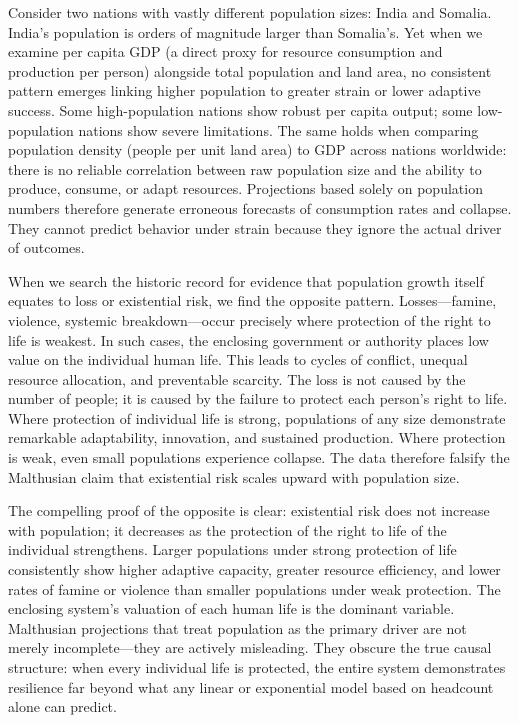 Consider two nations with vastly different population sizes: India and Somalia. India’s population is orders of magnitude larger than Somalia’s. Yet when we examine per capita GDP (a direct proxy for resource consumption and production per person) alongside total population and land area, no consistent pattern emerges linking higher population to greater strain or lower adaptive success. Some high-population nations show robust per capita output; some low-population nations show severe limitations. The same holds when comparing population density (people per unit land area) to GDP across nations worldwide: there is no reliable correlation between raw population size and the ability to produce, consume, or adapt resources. Projections based solely on population numbers therefore generate erroneous forecasts of consumption rates and collapse. They cannot predict behavior under strain because they ignore the actual driver of outcomes.

When we search the historic record for evidence that population growth itself equates to loss or existential risk, we find the opposite pattern. Losses—famine, violence, systemic breakdown—occur precisely where protection of the right to life is weakest. In such cases, the enclosing government or authority places low value on the individual human life. This leads to cycles of conflict, unequal resource allocation, and preventable scarcity. The loss is not caused by the number of people; it is caused by the failure to protect each person’s right to life. Where protection of individual life is strong, populations of any size demonstrate remarkable adaptability, innovation, and sustained production. Where protection is weak, even small populations experience collapse. The data therefore falsify the Malthusian claim that existential risk scales upward with population size.

The compelling proof of the opposite is clear: existential risk does not increase with population; it decreases as the protection of the right to life of the individual strengthens. Larger populations under strong protection of life consistently show higher adaptive capacity, greater resource efficiency, and lower rates of famine or violence than smaller populations under weak protection. The enclosing system’s valuation of each human life is the dominant variable. Malthusian projections that treat population as the primary driver are not merely incomplete—they are actively misleading. They obscure the true causal structure: when every individual life is protected, the entire system demonstrates resilience far beyond what any linear or exponential model based on headcount alone can predict.

